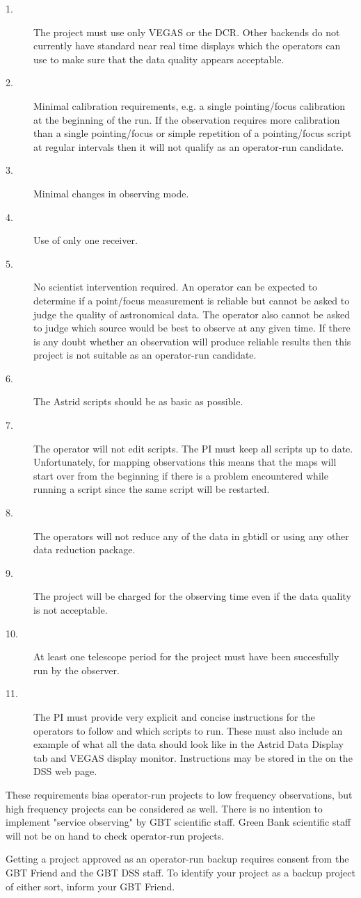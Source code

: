 \begin{description}
\item[1. ] The project must use only VEGAS or the DCR.  Other backends do not currently have
standard near real time displays which the operators can use to make sure that the data
quality appears acceptable.
\item[2. ] Minimal calibration requirements, e.g. a single pointing/focus calibration at the
beginning of the run. If the observation requires more calibration than a single
pointing/focus or simple repetition of a pointing/focus script at regular intervals
then it will not qualify as an operator-run candidate.
\item[3. ] Minimal changes in observing mode.
\item[4. ] Use of only one receiver.
\item[5. ] No scientist intervention required. An operator can be expected to determine if a
point/focus measurement is reliable but cannot be asked to judge the quality of
astronomical data. The operator also cannot be asked to judge which source
would be best to observe at any given time. If there is any doubt whether an
observation will produce reliable  results then this project is not suitable as
an operator-run candidate.
\item[6. ] The Astrid scripts should be as basic as possible.
\item[7. ] The operator will not edit scripts.  The PI must keep all scripts up to date.  Unfortunately,
for mapping observations this means that the maps will start over from the beginning if there
is a problem encountered while running a script since the same script will be restarted.
\item[8. ] The operators will not reduce any of the data in gbtidl or using any other data reduction package.
\item[9. ] The project will be charged for the observing time even if the data quality is not acceptable.
\item[10.] At least one telescope period for the project must have been succesfully run by the observer.
\item[11.] The PI must provide very explicit and concise instructions for the operators to follow and which
scripts to run. These must also include an example of what all the data should look like in
the Astrid Data Display tab and VEGAS display monitor.  Instructions may be stored in the 
 on the DSS web page.

\end{description}

These requirements bias operator-run projects to low frequency observations, but high
frequency projects can be considered as well. There is no intention to implement
"service observing" by GBT scientific staff. Green Bank scientific staff will not be on
hand to check operator-run projects.

Getting a project approved as an operator-run backup requires consent from the GBT
Friend and the GBT DSS staff. To identify your project as a backup project of either
sort, inform your GBT Friend.
